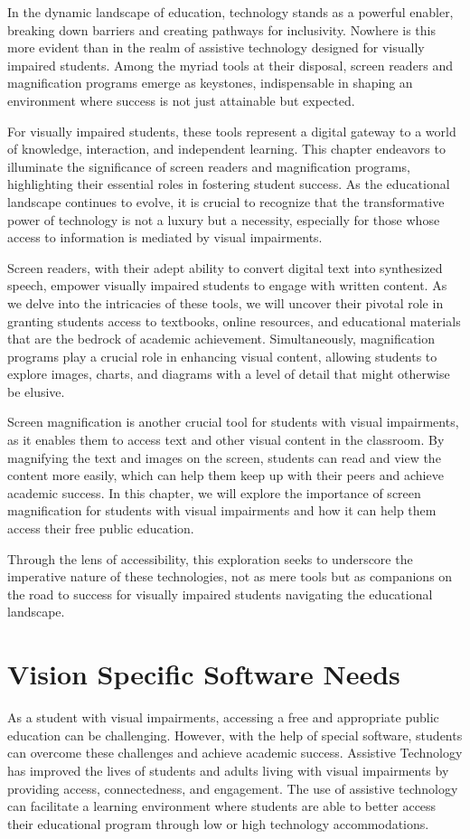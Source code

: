 \documentclass[12pt,letterpaper,twoside,openright]{report}
\begin{document}
In the dynamic landscape of education, technology stands as a powerful enabler, breaking down barriers and creating pathways for inclusivity. Nowhere is this more evident than in the realm of assistive technology designed for visually impaired students. Among the myriad tools at their disposal, screen readers and magnification programs emerge as keystones, indispensable in shaping an environment where success is not just attainable but expected.

For visually impaired students, these tools represent a digital gateway to a world of knowledge, interaction, and independent learning. This chapter endeavors to illuminate the significance of screen readers and magnification programs, highlighting their essential roles in fostering student success. As the educational landscape continues to evolve, it is crucial to recognize that the transformative power of technology is not a luxury but a necessity, especially for those whose access to information is mediated by visual impairments.

Screen readers, with their adept ability to convert digital text into synthesized speech, empower visually impaired students to engage with written content. As we delve into the intricacies of these tools, we will uncover their pivotal role in granting students access to textbooks, online resources, and educational materials that are the bedrock of academic achievement. Simultaneously, magnification programs play a crucial role in enhancing visual content, allowing students to explore images, charts, and diagrams with a level of detail that might otherwise be elusive.

Screen magnification is another crucial tool for students with visual impairments, as it enables them to access text and other visual content in the classroom.  By magnifying the text and images on the screen, students can read and view the content more easily, which can help them keep up with their peers and achieve academic success. In this chapter, we will explore the importance of screen magnification for students with visual impairments and how it can help them access their free public education.

Through the lens of accessibility, this exploration seeks to underscore the imperative nature of these technologies, not as mere tools but as companions on the road to success for visually impaired students navigating the educational landscape.

\pagebreak \hypertarget{software-needs}{}\section{Vision Specific Software Needs}\label{software-needs}
As a student with visual impairments, accessing a free and appropriate public education can be challenging. However, with the help of special software, students can overcome these challenges and achieve academic success. Assistive Technology has improved the lives of students and adults living with visual impairments by providing access, connectedness, and engagement. The use of assistive technology can facilitate a learning environment where students are able to better access their educational program through low or high technology accommodations.
\end{document}
